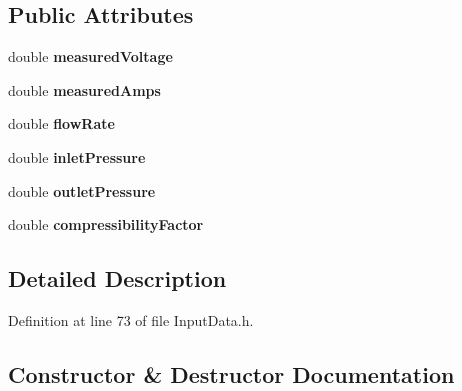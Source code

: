 \subsection*{Public Attributes}
\begin{DoxyCompactItemize}
\item 
\mbox{\label{struct_fan_1_1_field_data_modified_and_optimal_ab83f8ec0206301d0a9183e8f5c21715b}} 
double {\bfseries measured\+Voltage}
\item 
\mbox{\label{struct_fan_1_1_field_data_modified_and_optimal_aeb8d08500d1d4d46249d47fb17b92399}} 
double {\bfseries measured\+Amps}
\item 
\mbox{\label{struct_fan_1_1_field_data_modified_and_optimal_a318f3966d9342fdafa54540cdea17d7e}} 
double {\bfseries flow\+Rate}
\item 
\mbox{\label{struct_fan_1_1_field_data_modified_and_optimal_a8c3c778cad0dd2e28641bb88c3c02d32}} 
double {\bfseries inlet\+Pressure}
\item 
\mbox{\label{struct_fan_1_1_field_data_modified_and_optimal_ad7646d5d42af6d31a8e79956152ee346}} 
double {\bfseries outlet\+Pressure}
\item 
\mbox{\label{struct_fan_1_1_field_data_modified_and_optimal_a3d6486a987abce16f87f9a9895636a9b}} 
double {\bfseries compressibility\+Factor}
\end{DoxyCompactItemize}


\subsection{Detailed Description}


Definition at line 73 of file Input\+Data.\+h.



\subsection{Constructor \& Destructor Documentation}
\mbox{\label{struct_fan_1_1_field_data_modified_and_optimal_a36b1ce30716ee49fab15b711225f1794}} 
